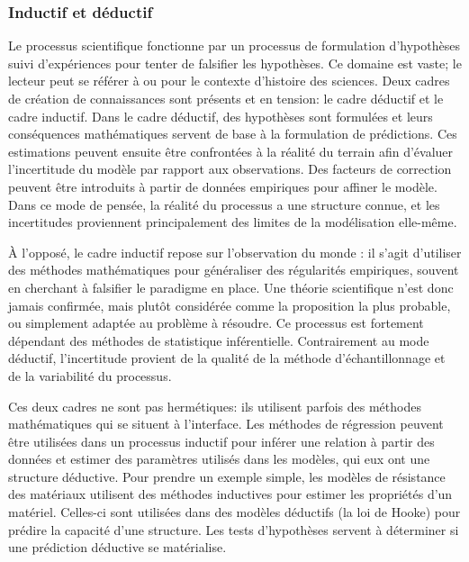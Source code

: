         \subsubsection{Inductif et déductif}
        Le processus scientifique fonctionne par un processus de formulation d'hypothèses suivi d'expériences pour tenter de falsifier les hypothèses. Ce domaine est vaste; le lecteur peut se référer à \textcite{thompson_understand_2012} ou \textcite{ziman_research_1984} pour le contexte d'histoire des sciences. Deux cadres de création de connaissances sont présents et en tension: le cadre déductif et le cadre inductif. Dans le cadre déductif, des hypothèses sont formulées et leurs conséquences mathématiques servent de base à la formulation de prédictions. Ces estimations peuvent ensuite être confrontées à la réalité du terrain afin d'évaluer l'incertitude du modèle par rapport aux observations. Des facteurs de correction peuvent être introduits à partir de données empiriques pour affiner le modèle. Dans ce mode de pensée, la réalité du processus a une structure connue, et les incertitudes proviennent principalement des limites de la modélisation elle-même.\par
        À l'opposé, le cadre inductif repose sur l'observation du monde : il s'agit d'utiliser des méthodes mathématiques pour généraliser des régularités empiriques, souvent en cherchant à falsifier le paradigme en place. Une théorie scientifique n'est donc jamais confirmée, mais plutôt considérée comme la proposition la plus probable, ou simplement adaptée au problème à résoudre. Ce processus est fortement dépendant des méthodes de statistique inférentielle. Contrairement au mode déductif, l'incertitude provient de la qualité de la méthode d'échantillonnage et de la variabilité du processus.\par
        Ces deux cadres ne sont pas hermétiques: ils utilisent parfois des méthodes mathématiques qui se situent à l'interface. Les méthodes de régression peuvent être utilisées dans un processus inductif pour inférer une relation à partir des données et estimer des paramètres utilisés dans les modèles, qui eux ont une structure déductive. Pour prendre un exemple simple, les modèles de résistance des matériaux utilisent des méthodes inductives pour estimer les propriétés d'un matériel. Celles-ci sont utilisées dans des modèles déductifs (la loi de Hooke) pour prédire la capacité d'une structure. Les tests d'hypothèses servent à déterminer si une prédiction déductive se matérialise. \par
